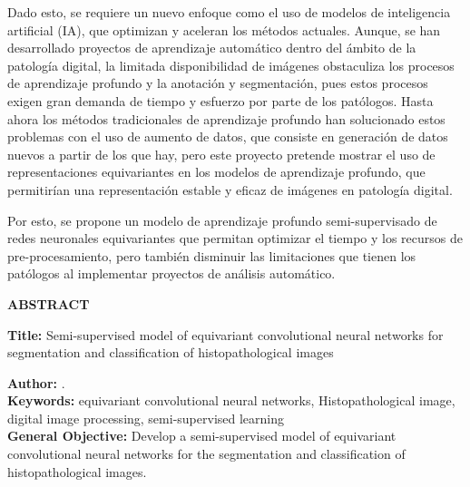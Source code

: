 \documentclass[12pt,letterpaper,final, openany]{scrbook}
\begin{document}
Dado esto, se requiere un nuevo enfoque como el uso de modelos de inteligencia artificial (IA), que optimizan y aceleran los métodos actuales. Aunque, se han desarrollado proyectos de aprendizaje automático dentro del ámbito de la patología digital, la limitada disponibilidad de imágenes obstaculiza los procesos de aprendizaje profundo y la anotación y segmentación, pues estos procesos exigen gran demanda de tiempo y esfuerzo por parte de los patólogos. Hasta ahora los métodos tradicionales de aprendizaje profundo han solucionado estos problemas con el uso de aumento de datos, que consiste en generación de datos nuevos a partir de los que hay, pero este proyecto pretende mostrar el uso de representaciones equivariantes en los modelos de aprendizaje profundo, que permitirían una representación estable y eficaz de imágenes en patología digital.

Por esto, se propone un modelo de aprendizaje profundo semi-supervisado de redes neuronales equivariantes que permitan optimizar el tiempo y los recursos de pre-procesamiento, pero también disminuir las limitaciones que tienen los patólogos al implementar proyectos de análisis automático. 


 
\vspace*{2cm}


\newpage
{}
\begin{center}
	\Large\textbf{ABSTRACT}\\[20pt]
\end{center}
\textbf{Title:} Semi-supervised model of equivariant convolutional neural networks for segmentation and classification of histopathological images\footnotemark[1]

\vspace*{5mm}

\textbf{Author:} \Author.\footnotemark[2] \\ 

\textbf{Keywords:} equivariant convolutional neural networks, Histopathological image, digital image processing, semi-supervised learning \\	



\textbf{General Objective:}
 Develop a semi-supervised model of equivariant convolutional neural networks for the segmentation and classification of histopathological images.
\end{document}

